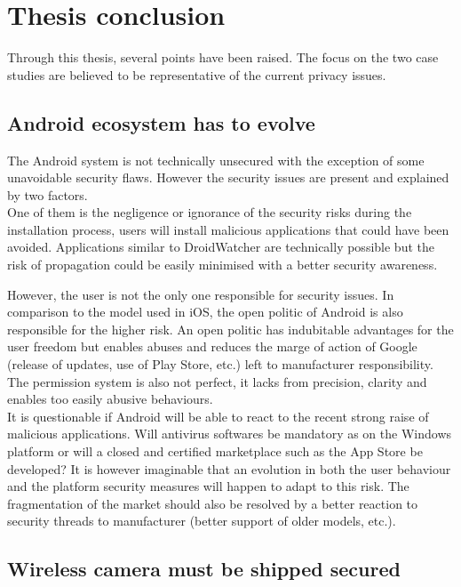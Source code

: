 \chapter{Thesis conclusion}
\label{chap:thesis-ccl}


Through this thesis, several points have been raised.
The focus on the two case studies are believed to be representative of the current privacy issues.

\section{Android ecosystem has to evolve}

The Android system is not technically unsecured with the exception of some unavoidable security flaws.
However the security issues are present and explained by two factors.\\

One of them is the negligence or ignorance of the security risks during the installation process, users will install malicious applications that could have been avoided.
Applications similar to DroidWatcher are technically possible but the risk of propagation could be easily minimised with a better security awareness.

However, the user is not the only one responsible for security issues.
In comparison to the model used in iOS, the open politic of Android is also responsible for the higher risk.
An open politic has indubitable advantages for the user freedom but enables abuses and reduces the marge of action of Google (release of updates, use of Play Store, etc.) left to manufacturer responsibility.
The permission system  is also not perfect, it lacks from precision, clarity and enables too easily abusive behaviours.\\

It is questionable if Android will be able to react to the recent strong raise of malicious applications.
Will antivirus softwares be mandatory as on the Windows platform or will a closed and certified marketplace such as the App Store be developed?
It is however imaginable that an evolution in both the user behaviour and the platform security measures will happen to adapt to this risk.
The fragmentation of the market should also be resolved by a better reaction to security threads to manufacturer (better support of older models, etc.).

\section{Wireless camera must be shipped secured}


